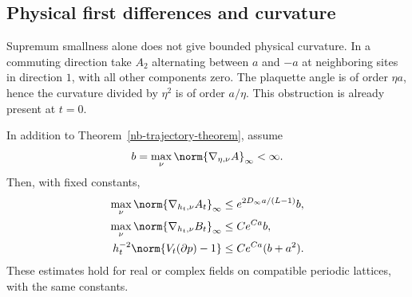 \subsection{Physical first differences and curvature}

Supremum smallness alone does not give bounded physical
curvature. In a commuting direction take $A_2$ alternating
between $a$ and $-a$ at neighboring sites in direction $1$,
with all other components zero. The plaquette angle is of
order $\eta a$, hence the curvature divided by $\eta^2$ is
of order $a/\eta$. This obstruction is already present at $t=0$.

\begin{theorem}\label{nb-C1-theorem}
In addition to Theorem~\ref{nb-trajectory-theorem}, assume
\begin{equation}\label{nb-input-gradient}
 b=\max_\nu\norm{\nabla_{\eta,\nu}A}_\infty<\infty.
\end{equation}
Then, with fixed constants,
\begin{align}
 \max_\nu\norm{\nabla_{h_t,\nu}A_t}_\infty
       &\le e^{2D_\infty a/(L-1)}b,
                                      \label{nb-corrected-C1}\\
 \max_\nu\norm{\nabla_{h_t,\nu}B_t}_\infty
       &\le C e^{Ca}b,                  \label{nb-ordinary-C1}\\
 h_t^{-2}\norm{V_t(\partial p)-1}
       &\le C e^{Ca}(b+a^2).            \label{nb-curvature}
\end{align}
These estimates hold for real or complex fields on compatible
periodic lattices, with the same constants.
\end{theorem}

